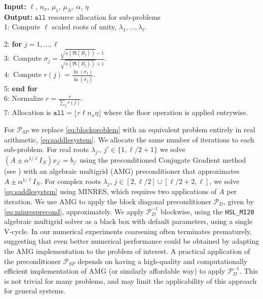 \documentclass{article}
\newcommand{\umax}{\mu_{1}}
\newcommand{\umin}{\mu_{\sizeA}}
\newcommand{\sizeA}{N}
\newcommand{\resource}{\eta}
\theoremstyle{definition}
\begin{document}
{{\begin{algorithm}[ht]
				
				\textbf{Input:} $\ell$, $n_x$, $\umax$, $\umin$, $\alpha$, $\resource$ \\
				\textbf{Output:} {$\texttt{all}$ resource allocation for sub-problems}\\
				1: Compute $\ell$ scaled roots of unity, $\lambda_1,\dots,\lambda_{\ell}$.
				
				2: \textbf{for }{$j = 1,\dots,\ell$}{\\
					3: \,\quad Compute $\sigma_{{j}} = \frac{\sqrt{\kappa(\Re(B_j))}-1}{\sqrt{\kappa(\Re(B_j))}+1}$.\\
					4: \,\quad Compute $r({{j}}) = \frac{\ln(\sigma_1)}{\ln(\sigma_{{j}})}$.
				}\\
				5: \textbf{end for}\\
				6: Normalize $r = \frac{r}{\sum_{{j}}r{(j)}}$. \\
				7: Allocation is $\texttt{all} = \lfloor r  \ell n_x \resource\rfloor$ where the floor operation is applied entrywise.
			\end{algorithm}
			
			
			
			For $\mathcal{P}_{SP}$  we replace \eqref{eq:blockproblem} with an equivalent problem entirely in real arithmetic, \eqref{eq:saddlesystem}. {We allocate the same number of iterations to each sub-problem}. For real roots $\lambda_{j'}$, $j'\in \{1,\ell/2+1\}$ we solve 
			$({{A}}\pm{\alpha^{1/\ell}}{I}_\sizeA) x_{j'} = b_{j'}$  using the preconditioned Conjugate Gradient method (see \cite{HestenesStiefel}) with an algebraic multigrid (AMG) \cite{ruge1987algebraic} preconditioner that approximates $A \pm \alpha^{1/\ell} I_N$. For complex roots $\lambda_{j}$, $j \in [2,\ell/2]\cup [\ell/2+2,\ell]$, we solve \eqref{eq:saddlesystem} using MINRES, {which requires two applications of $A$ per iteration}. We use AMG to apply the block diagonal preconditioner $\mathcal{P}_{D}$, given by \eqref{eq:minresprecond}, approximately.
			We apply $\mathcal{P}_{D}^{-1}$ blockwise, using the \texttt{HSL\_MI20} algebraic multigrid solver \cite{boyle2010hsl_mi20} as a black box with default parameters, using a single V-cycle. In our numerical experiments coarsening often terminates prematurely, suggesting that even better numerical performance could be obtained by adapting the AMG implementation to the problem of interest.  
			A practical application of the preconditioner $\mathcal{P}_{SP}$ depends on having a high-quality and computationally efficient implementation of AMG (or similarly affordable way) to apply $\mathcal{P}_{D}^{-1}$. This is not trivial for many problems, and may limit the applicability of this approach for general systems.
			
}}
\end{document}
